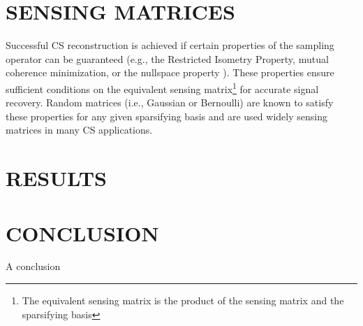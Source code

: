 \documentclass[journal]{IEEEtran}
\begin{document}
\section{SENSING MATRICES}

Successful CS reconstruction is achieved if certain properties of the sampling operator can be guaranteed (e.g., the Restricted Isometry Property, mutual coherence minimization, or the nullspace property \cite{tcs}).  These properties ensure sufficient conditions on the equivalent sensing matrix\footnote{The equivalent sensing matrix is the product of the sensing matrix and the sparsifying basis} for accurate signal recovery. Random matrices (i.e., Gaussian or Bernoulli) are known to satisfy these properties for any given sparsifying basis and are used widely sensing matrices in many CS applications.

\section{RESULTS}

\section{CONCLUSION}

A conclusion



{}
\end{document}
